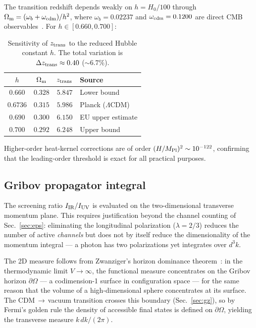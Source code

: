 \documentclass[a4paper,fleqn]{cas-dc}
\newcommand{\ztrans}{z_{\rm trans}}
\newcommand{\Om}{\Omega_{\rm m}}
\newcommand{\MPl}{M_{\rm Pl}}
\begin{document}
The transition redshift depends weakly on $h = H_0/100$ through
$\Om = (\omega_b + \omega_{\rm cdm})/h^2$, where $\omega_b = 0.02237$
and $\omega_{\rm cdm} = 0.1200$ are direct CMB
observables~\cite{planck2018}. For $h \in [0.660, 0.700]$:

\begin{table}[pos=!htbp]
\caption{Sensitivity of $\ztrans$ to the reduced Hubble constant $h$.
  The total variation is $\Delta\ztrans \approx 0.40$ ($\sim 6.7\%$).}
\label{tab:ztrans_sensitivity}
\begin{tabular}{cccl}
$h$ & $\Om$ & $\ztrans$ & Source \\
\hline
$0.660$ & $0.328$ & $5.847$ & Lower bound \\
$0.6736$ & $0.315$ & $5.986$ & Planck ($\Lambda$CDM) \\
$0.690$ & $0.300$ & $6.150$ & EU upper estimate \\
$0.700$ & $0.292$ & $6.248$ & Upper bound \\
\end{tabular}
\end{table}

\noindent
Higher-order heat-kernel corrections are of order
$(H/\MPl)^2 \sim 10^{-122}$, confirming that the leading-order
threshold is exact for all practical purposes.

\subsection{Gribov propagator integral}
\label{app:gribov_integral}

The screening ratio $I_{\rm IR}/I_{\rm UV}$ is evaluated on the
two-dimensional transverse momentum plane. This requires
justification beyond the channel counting of
Sec.~\ref{sec:eps}: eliminating the longitudinal
polarization ($\lambda = 2/3$) reduces the number of active
\textit{channels} but does not by itself reduce the dimensionality of
the momentum integral --- a photon has two polarizations yet
integrates over $d^3k$.

The 2D measure follows from Zwanziger's horizon dominance
theorem~\cite{zwanziger1991}: in the thermodynamic limit
$V \to \infty$, the functional measure concentrates on the Gribov
horizon $\partial\Omega$ --- a codimension-1 surface in configuration
space --- for the same reason that the volume of a high-dimensional
sphere concentrates at its surface. The CDM$\,\to\,$vacuum transition
crosses this boundary (Sec.~\ref{sec:gz}), so by Fermi's
golden rule the density of accessible final states is defined on
$\partial\Omega$, yielding the transverse measure $k\,dk/(2\pi)$.
\end{document}
